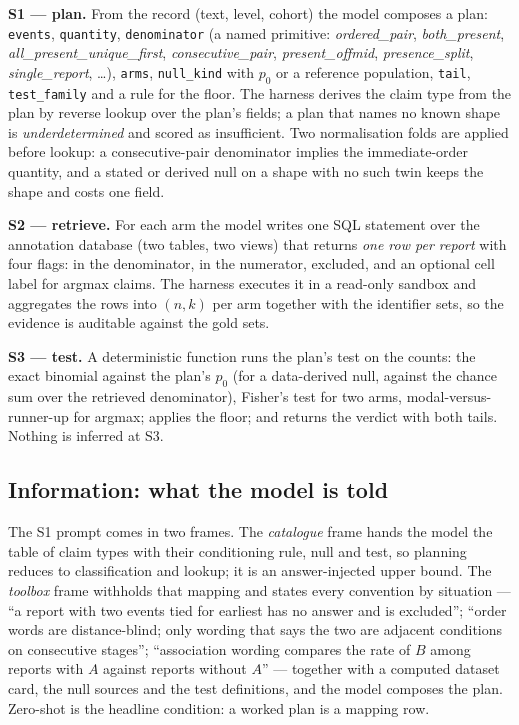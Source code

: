 \textbf{S1 --- plan.} From the record (text, level, cohort) the model composes
a plan: \texttt{events}, \texttt{quantity}, \texttt{denominator} (a named
primitive: \emph{ordered\_pair}, \emph{both\_present},
\emph{all\_present\_unique\_first}, \emph{consecutive\_pair},
\emph{present\_offmid}, \emph{presence\_split}, \emph{single\_report}, \ldots),
\texttt{arms}, \texttt{null\_kind} with $p_0$ or a reference population,
\texttt{tail}, \texttt{test\_family} and a rule for the floor. The harness
derives the claim type from the plan by reverse lookup over the plan's fields;
a plan that names no known shape is \emph{underdetermined} and scored as
insufficient. Two normalisation folds are applied before lookup: a
consecutive-pair denominator implies the immediate-order quantity, and a
stated or derived null on a shape with no such twin keeps the shape and costs
one field.

\textbf{S2 --- retrieve.} For each arm the model writes one SQL statement over
the annotation database (two tables, two views) that returns \emph{one row per
report} with four flags: in the denominator, in the numerator, excluded, and an
optional cell label for argmax claims. The harness executes it in a read-only
sandbox and aggregates the rows into $(n, k)$ per arm together with the
identifier sets, so the evidence is auditable against the gold sets.

\textbf{S3 --- test.} A deterministic function runs the plan's test on the
counts: the exact binomial against the plan's $p_0$ (for a data-derived null,
against the chance sum over the retrieved denominator), Fisher's test for two
arms, modal-versus-runner-up for argmax; applies the floor; and returns the
verdict with both tails. Nothing is inferred at S3.

\subsection{Information: what the model is told}
\label{sec:frames}

The S1 prompt comes in two frames. The \emph{catalogue} frame hands the model
the table of claim types with their conditioning rule, null and test, so
planning reduces to classification and lookup; it is an answer-injected upper
bound. The \emph{toolbox} frame withholds that mapping and states every
convention by situation --- ``a report with two events tied for earliest has no
answer and is excluded''; ``order words are distance-blind; only wording that
says the two are adjacent conditions on consecutive stages''; ``association
wording compares the rate of $B$ among reports with $A$ against reports without
$A$'' --- together with a computed dataset card, the null sources and the test
definitions, and the model composes the plan. Zero-shot is the headline
condition: a worked plan is a mapping row.

